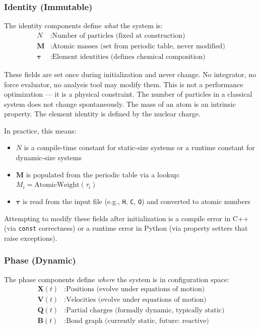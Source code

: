 \documentclass[11pt]{article}
\begin{document}
\subsubsection{Identity (Immutable)}

The identity components define \textit{what} the system is:
\begin{align}
N &: \text{Number of particles (fixed at construction)} \\
\mathbf{M} &: \text{Atomic masses (set from periodic table, never modified)} \\
\boldsymbol{\tau} &: \text{Element identities (defines chemical composition)}
\end{align}

These fields are set once during initialization and never change. No integrator, no force evaluator, no analysis tool may modify them. This is not a performance optimization — it is a physical constraint. The number of particles in a classical system does not change spontaneously. The mass of an atom is an intrinsic property. The element identity is defined by the nuclear charge.

In practice, this means:
\begin{itemize}
\item $N$ is a compile-time constant for static-size systems or a runtime constant for dynamic-size systems
\item $\mathbf{M}$ is populated from the periodic table via a lookup: $M_i = \text{AtomicWeight}(\tau_i)$
\item $\boldsymbol{\tau}$ is read from the input file (e.g., \texttt{H}, \texttt{C}, \texttt{O}) and converted to atomic numbers
\end{itemize}

Attempting to modify these fields after initialization is a compile error in C++ (via \texttt{const} correctness) or a runtime error in Python (via property setters that raise exceptions).

\subsubsection{Phase (Dynamic)}

The phase components define \textit{where} the system is in configuration space:
\begin{align}
\mathbf{X}(t) &: \text{Positions (evolve under equations of motion)} \\
\mathbf{V}(t) &: \text{Velocities (evolve under equations of motion)} \\
\mathbf{Q}(t) &: \text{Partial charges (formally dynamic, typically static)} \\
\mathbf{B}(t) &: \text{Bond graph (currently static, future: reactive)}
\end{align}
\end{document}
